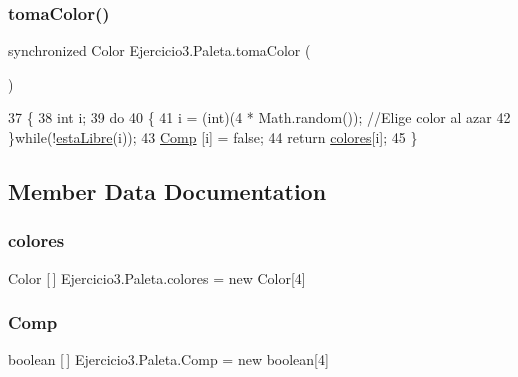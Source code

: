 \subsubsection{\texorpdfstring{toma\+Color()}{tomaColor()}}
{\footnotesize\ttfamily synchronized Color Ejercicio3.\+Paleta.\+toma\+Color (\begin{DoxyParamCaption}{ }\end{DoxyParamCaption})\hspace{0.3cm}{\ttfamily [inline]}}


\begin{DoxyCode}
37     \{
38         \textcolor{keywordtype}{int} i;
39         \textcolor{keywordflow}{do}
40         \{
41         i = (int)(4 * Math.random());  \textcolor{comment}{//Elige color al azar}
42         \}\textcolor{keywordflow}{while}(!\mbox{\hyperlink{class_ejercicio3_1_1_paleta_a4d66d1d99e8559d15abe32808bd51f00}{estaLibre}}(i));
43         \mbox{\hyperlink{class_ejercicio3_1_1_paleta_a1e0d32a96f88fc79dcca5cf1f5758f6b}{Comp}} [i] = \textcolor{keyword}{false};
44         \textcolor{keywordflow}{return} \mbox{\hyperlink{class_ejercicio3_1_1_paleta_ad197acb4f704b18fcf00ad02ad45b47d}{colores}}[i];
45     \}
\end{DoxyCode}


\subsection{Member Data Documentation}
\mbox{\label{class_ejercicio3_1_1_paleta_ad197acb4f704b18fcf00ad02ad45b47d}} 
\subsubsection{\texorpdfstring{colores}{colores}}
{\footnotesize\ttfamily Color \mbox{[}$\,$\mbox{]} Ejercicio3.\+Paleta.\+colores = new Color\mbox{[}4\mbox{]}}

\mbox{\label{class_ejercicio3_1_1_paleta_a1e0d32a96f88fc79dcca5cf1f5758f6b}} 
\subsubsection{\texorpdfstring{Comp}{Comp}}
{\footnotesize\ttfamily boolean \mbox{[}$\,$\mbox{]} Ejercicio3.\+Paleta.\+Comp = new boolean\mbox{[}4\mbox{]}\hspace{0.3cm}{\ttfamily [private]}}

